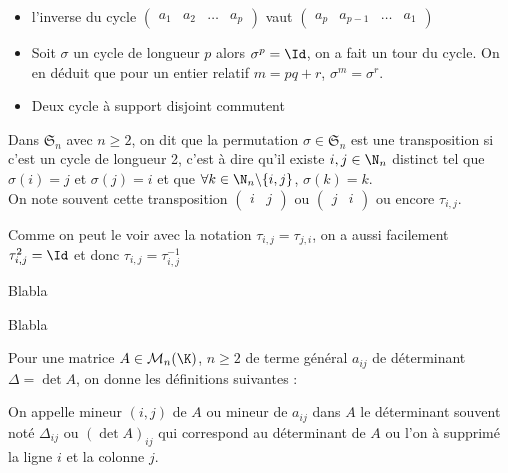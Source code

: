 \begin{prop}
\begin{itemize}
\item l'inverse du cycle $\begin{pmatrix}
    a_1&a_2&\dots &a_p
\end{pmatrix}$ vaut $\begin{pmatrix}
a_p&a_{p-1}&\dots &a_1
\end{pmatrix}$
\item Soit $\sigma$ un cycle de longueur $p$ alors $\sigma^p=\Id$, on a fait un tour du cycle.
On en déduit que pour un entier relatif $m=pq+r$, $\sigma^m=\sigma^r$.
\item Deux cycle à support disjoint commutent
\end{itemize}
\end{prop}
\begin{defini}[Transposition]
Dans $\mathfrak{S}_n$ avec $n\geq 2$, on dit que la permutation $\sigma\in\mathfrak{S}_n$ est une transposition si c'est un cycle de longueur 2, c'est à dire qu'il existe $i,j\in\N_n$ distinct tel que $\sigma(i)=j$ et $\sigma(j)=i$ et que $\forall k\in\N_n\backslash\{i,j\}$, $\sigma(k)=k$.\\
On note souvent cette transposition $\begin{pmatrix}
i & j
\end{pmatrix}$ ou $\begin{pmatrix}
j & i
\end{pmatrix}$ ou encore $\tau_{i,j}$.
\end{defini}
\begin{prop}
Comme on peut le voir avec la notation $\tau_{i,j}=\tau_{j,i}$, on a aussi facilement $\tau^2_{i,j}=\Id$ et donc $\tau_{i,j}=\tau^{-1}_{i,j}$\\
\end{prop}
\begin{theoreme}
    Blabla
\end{theoreme}
\begin{theoreme}
    Blabla
\end{theoreme}
Pour une matrice $A\in\mathcal{M}_n(\K)$, $n\geq2$ de terme général $a_{ij}$ de déterminant $\Delta=\det A$, on donne les définitions suivantes :\\
\begin{defini}
On appelle mineur $(i,j)$ de $A$ ou mineur de $a_{ij}$ dans $A$ le déterminant souvent noté $\Delta_{ij}$ ou $(\det A)_{ij}$ qui correspond au déterminant de $A$ ou l'on à supprimé la ligne $i$ et la colonne $j$.\\
\end{defini}
